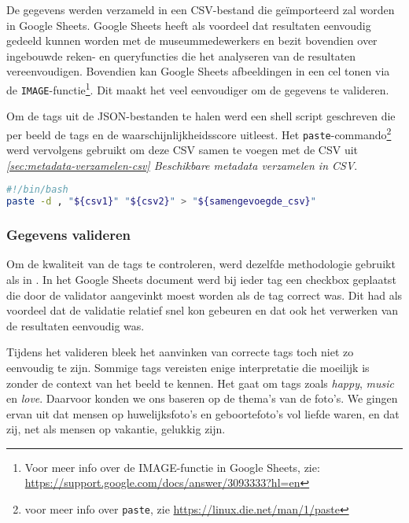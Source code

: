 De gegevens werden verzameld in een CSV-bestand die geïmporteerd zal worden in Google Sheets. Google Sheets heeft als voordeel dat resultaten eenvoudig gedeeld kunnen worden met de museummedewerkers en bezit bovendien over ingebouwde reken- en queryfuncties die het analyseren van de resultaten vereenvoudigen. Bovendien kan Google Sheets afbeeldingen in een cel tonen via de \texttt{IMAGE}-functie\footnote{Voor meer info over de IMAGE-functie in Google Sheets, zie: \url{https://support.google.com/docs/answer/3093333?hl=en}}. Dit maakt het veel eenvoudiger om de gegevens te valideren.

Om de tags uit de JSON-bestanden te halen werd een shell script geschreven die per beeld de tags en de waarschijnlijkheidsscore uitleest. Het \texttt{paste}-commando\footnote{voor meer info over \texttt{paste}, zie \url{https://linux.die.net/man/1/paste}} werd vervolgens gebruikt om deze CSV samen te voegen met de CSV uit \textit{\ref{sec:metadata-verzamelen-csv} Beschikbare metadata verzamelen in CSV}.

\begin{lstlisting}[language=bash, caption=Met het \texttt{paste}-commando kunnen twee bestanden samengevoegd worden in Bash]
#!/bin/bash
paste -d , "${csv1}" "${csv2}" > "${samengevoegde_csv}"
\end{lstlisting}


\subsubsection{Gegevens valideren}
\label{subsubsec:gegevens-valideren}

Om de kwaliteit van de tags te controleren, werd dezelfde methodologie gebruikt als in \textcite{Vanstappen2019}. In het Google Sheets document werd bij ieder tag een checkbox geplaatst die door de validator aangevinkt moest worden als de tag correct was. Dit had als voordeel dat de validatie relatief snel kon gebeuren en dat ook het verwerken van de resultaten eenvoudig was. 

Tijdens het valideren bleek het aanvinken van correcte tags toch niet zo eenvoudig te zijn. Sommige tags vereisten enige interpretatie die moeilijk is zonder de context van het beeld te kennen. Het gaat om tags zoals \textit{happy}, \textit{music} en \textit{love}. Daarvoor konden we ons baseren op de thema’s van de foto’s. We gingen ervan uit dat mensen op huwelijksfoto’s en geboortefoto’s vol liefde waren, en dat zij, net als mensen op vakantie, gelukkig zijn. 

